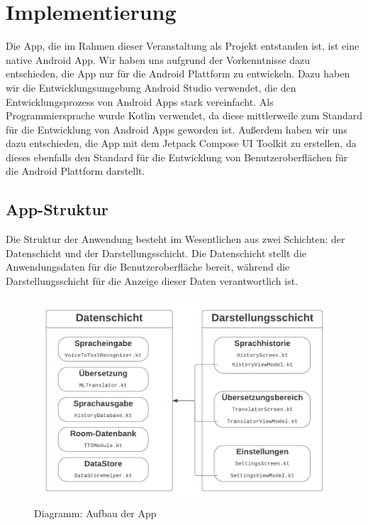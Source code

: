 \newpage
\section{Implementierung}\label{sec:implementation}
Die App, die im Rahmen dieser Veranstaltung als Projekt entstanden ist, ist eine native Android App. Wir haben uns aufgrund der Vorkenntnisse dazu entschieden, die App nur für die Android Plattform zu entwickeln. Dazu haben wir die Entwicklungsumgebung Android Studio verwendet, die den Entwicklungsprozess von Android Apps stark vereinfacht. Als Programmiersprache wurde Kotlin verwendet, da diese mittlerweile zum Standard für die Entwicklung von Android Apps geworden ist. Außerdem haben wir uns dazu entschieden, die App mit dem Jetpack Compose UI Toolkit zu erstellen, da dieses ebenfalls den Standard für die Entwicklung von Benutzeroberflächen für die Android Plattform darstellt.

\subsection{App-Struktur}
Die Struktur der Anwendung besteht im Wesentlichen aus zwei Schichten: der Datenschicht und der Darstellungsschicht. Die Datenschicht stellt die Anwendungsdaten für die Benutzeroberfläche bereit, während die Darstellungsschicht für die Anzeige dieser Daten verantwortlich ist.

\medbreak

\begin{figure}[H]
    \includegraphics[width=\textwidth, center]{resources/SysAdmin_App_architecture.png}
    \caption[Diagramm: Aufbau der App]{Diagramm: Aufbau der App}
\end{figure}

